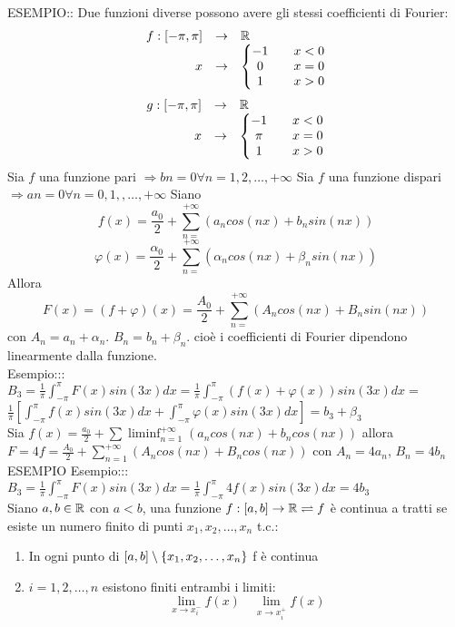 ESEMPIO:: Due funzioni diverse possono avere gli stessi coefficienti di Fourier:
$$\begin{array}{rcl} f: \left[-\pi,\pi\right] & \to &  \mathbb{R} \\
x & \to & \left\{\begin{matrix} -1 && x<0\\0&&x= 0\\1&&x>0 \end{matrix}\right.\end{array}$$
$$\begin{array}{rcl} g: \left[-\pi,\pi\right] & \to &  \mathbb{R} \\
x & \to & \left\{\begin{matrix} -1 && x<0\\\pi&&x= 0\\1&&x>0 \end{matrix}\right.\end{array}$$
\observation
Sia $f$ una funzione pari $\Rightarrow bn=0 \forall n=1,2,\ldots,+\infty$
\observation
Sia $f$ una funzione dispari $\Rightarrow an=0 \forall n=0,1,,\ldots,+\infty$
\observation
Siano 
$$f(x)=\frac{a_0}{2}+\sum\limits_{n=}^{+\infty}\left(a_ncos(nx)+b_nsin(nx)\right)$$
$$\varphi(x)=\frac{\alpha_0}{2}+\sum\limits_{n=}^{+\infty}\left(\alpha_ncos(nx)+\beta_nsin(nx)\right)$$
Allora
$$ F(x)=(f+\varphi)(x)=\frac{A_0}{2}+\sum\limits_{n=}^{+\infty}\left(A_ncos(nx)+B_nsin(nx)\right)$$
con $A_n=a_n+\alpha_n$. $B_n=b_n+\beta_n$.
cioè i coefficienti di Fourier dipendono linearmente dalla funzione.\\
Esempio::: $B_3=\frac{1}{\pi}\int_{-\pi}^{\pi}F(x)sin(3x)dx=\frac{1}{\pi}\int_{-\pi}^{\pi}(f(x)+\varphi(x))sin(3x)dx=$\\
$\frac{1}{\pi}\left[\int_{-\pi}^{\pi}f(x)sin(3x)dx+\int_{-\pi}^{\pi}\varphi(x)sin(3x)dx\right]=b_3+\beta_3$\\
Sia $f(x)=\frac{a_0}{2}+\sum\liminf_{n=1}^{+\infty}\left(a_ncos(nx)+b_ncos(nx)\right)$ allora $F=4f=\frac{A_0}{2}+\sum\limits_{n=1}^{+\infty}\left(A_ncos(nx)+B_ncos(nx)\right)$ con $A_n=4a_n$, $B_n=4b_n$\\
ESEMPIO
Esempio:::$B_3=\frac{1}{\pi}\int_{-\pi}^{\pi}F(x)sin(3x)dx=\frac{1}{\pi}\int_{-\pi}^{\pi}4f(x)sin(3x)dx=4b_3$\\
Siano $a,b\in \mathbb{R}$ con $a<b$, una funzione $f:\left[a,b\right]\to \mathbb{R}\rightleftharpoons f$ è continua a tratti se esiste un numero finito di punti $x_1,x_2,\ldots,x_n$ t.c.:\\
\begin{enumerate}
	\item In ogni punto di $\left[a,b\right]\setminus\left\{x_1,x_2,\ldots,x_n\right\}$ f è continua
	\item $i=1,2,\ldots,n$ esistono finiti entrambi i limiti:
	$$\lim\limits_{x\to x_i^{-}}f(x)\quad \lim\limits_{x\to x_i^{+}}f(x)$$
\end{enumerate}

